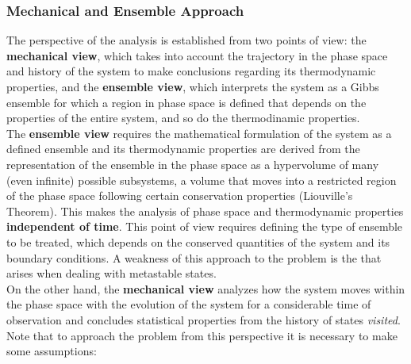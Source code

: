 \documentclass{article}
\begin{document}
\subsubsection{Mechanical and Ensemble Approach}
The perspective of the analysis is established from two points of view: the \textbf{mechanical view}, which takes into account the trajectory in the phase space and history of the system to make conclusions regarding its thermodynamic properties, and the \textbf{ensemble view}, which interprets the system as a Gibbs ensemble for which a region in phase space is defined that depends on the properties of the entire system, and so do the thermodinamic properties. \\
The \textbf{ensemble view} requires the mathematical formulation of the system as a defined ensemble and its thermodynamic properties are derived from the representation of the ensemble in the phase space as a hypervolume of many (even infinite) possible subsystems, a volume that moves into a restricted region of the phase space following certain conservation properties (Liouville's Theorem). This makes the analysis of phase space and thermodynamic properties \textbf{independent of time}. This point of view requires defining the type of ensemble to be treated, which depends on the conserved quantities of the system and its boundary conditions. A weakness of this approach to the problem is the  that arises when dealing with metastable states.\\
On the other hand, the \textbf{mechanical view} analyzes how the system moves within the phase space with the evolution of the system for a considerable time of observation and concludes statistical properties from the history of states \textit{visited}. Note that to approach the problem from this perspective it is necessary to make some assumptions:
\end{document}
